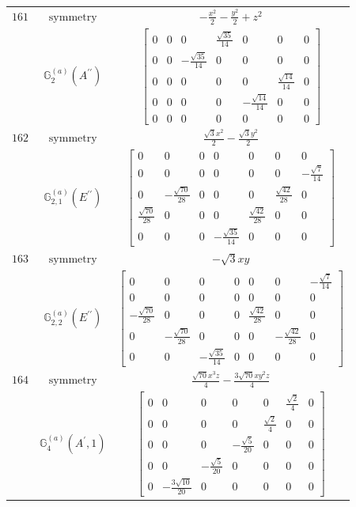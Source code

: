 \documentclass[fleqn,8pt,landscape]{jsarticle}
\begin{document}
\begin{longtable}{ccc}
$ 161 $ & $ \text{symmetry} $ & $ - \frac{x^{2}}{2} - \frac{y^{2}}{2} + z^{2} $ \\
$  $ & $ \mathbb{G}_{2}^{(a)}(A^{\prime\prime}) $ & $ \begin{bmatrix} 0 & 0 & 0 & \frac{\sqrt{35}}{14} & 0 & 0 & 0 \\ 0 & 0 & - \frac{\sqrt{35}}{14} & 0 & 0 & 0 & 0 \\ 0 & 0 & 0 & 0 & 0 & \frac{\sqrt{14}}{14} & 0 \\ 0 & 0 & 0 & 0 & - \frac{\sqrt{14}}{14} & 0 & 0 \\ 0 & 0 & 0 & 0 & 0 & 0 & 0 \end{bmatrix} $ \\ \hline
$ 162 $ & $ \text{symmetry} $ & $ \frac{\sqrt{3} x^{2}}{2} - \frac{\sqrt{3} y^{2}}{2} $ \\
$  $ & $ \mathbb{G}_{2,1}^{(a)}(E^{\prime\prime}) $ & $ \begin{bmatrix} 0 & 0 & 0 & 0 & 0 & 0 & 0 \\ 0 & 0 & 0 & 0 & 0 & 0 & - \frac{\sqrt{7}}{14} \\ 0 & - \frac{\sqrt{70}}{28} & 0 & 0 & 0 & \frac{\sqrt{42}}{28} & 0 \\ \frac{\sqrt{70}}{28} & 0 & 0 & 0 & \frac{\sqrt{42}}{28} & 0 & 0 \\ 0 & 0 & 0 & - \frac{\sqrt{35}}{14} & 0 & 0 & 0 \end{bmatrix} $ \\ \hline
$ 163 $ & $ \text{symmetry} $ & $ - \sqrt{3} x y $ \\
$  $ & $ \mathbb{G}_{2,2}^{(a)}(E^{\prime\prime}) $ & $ \begin{bmatrix} 0 & 0 & 0 & 0 & 0 & 0 & - \frac{\sqrt{7}}{14} \\ 0 & 0 & 0 & 0 & 0 & 0 & 0 \\ - \frac{\sqrt{70}}{28} & 0 & 0 & 0 & \frac{\sqrt{42}}{28} & 0 & 0 \\ 0 & - \frac{\sqrt{70}}{28} & 0 & 0 & 0 & - \frac{\sqrt{42}}{28} & 0 \\ 0 & 0 & - \frac{\sqrt{35}}{14} & 0 & 0 & 0 & 0 \end{bmatrix} $ \\ \hline
$ 164 $ & $ \text{symmetry} $ & $ \frac{\sqrt{70} x^{3} z}{4} - \frac{3 \sqrt{70} x y^{2} z}{4} $ \\
$  $ & $ \mathbb{G}_{4}^{(a)}(A^{\prime},1) $ & $ \begin{bmatrix} 0 & 0 & 0 & 0 & 0 & \frac{\sqrt{2}}{4} & 0 \\ 0 & 0 & 0 & 0 & \frac{\sqrt{2}}{4} & 0 & 0 \\ 0 & 0 & 0 & - \frac{\sqrt{5}}{20} & 0 & 0 & 0 \\ 0 & 0 & - \frac{\sqrt{5}}{20} & 0 & 0 & 0 & 0 \\ 0 & - \frac{3 \sqrt{10}}{20} & 0 & 0 & 0 & 0 & 0 \end{bmatrix} $ \\ \hline

\end{longtable}
\end{document}
